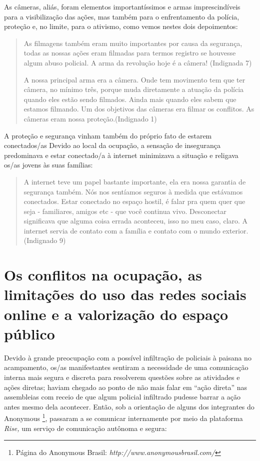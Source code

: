 As câmeras, aliás, foram elementos importantíssimos e armas
imprescindíveis para a visibilização das ações, mas também para o
enfrentamento da polícia, proteção e, no limite, para o ativismo, como
vemos nestes dois depoimentos:

\begin{quote}
As filmagens também eram muito importantes por causa da segurança, todas
as nossas ações eram filmadas para termos registro se houvesse algum
abuso policial. A arma da revolução hoje é a câmera! (Indignada 7)

A nossa principal arma era a câmera. Onde tem movimento tem que ter
câmera, no mínimo três, porque muda diretamente a atuação da polícia
quando eles estão sendo filmados. Ainda mais quando eles sabem que
estamos filmando. Um dos objetivos das câmeras era filmar os conflitos.
As câmeras eram nossa proteção.(Indignado 1)
\end{quote}

A proteção e segurança vinham também do próprio fato de estarem
conectados/as Devido ao local da ocupação, a sensação de insegurança
predominava e estar conectado/a à internet minimizava a situação e
religava os/as jovens às suas famílias:

\begin{quote}
A internet teve um papel bastante importante, ela era nossa garantia de
segurança também. Nós nos sentíamos seguros à medida que estávamos
conectados. Estar conectado no espaço hostil, é falar pra quem quer que
seja - familiares, amigos etc - que você continua vivo. Desconectar
significava que alguma coisa errada aconteceu, isso no meu caso, claro.
A internet servia de contato com a família e contato com o mundo
exterior. (Indignado 9)
\end{quote}

\section{Os conflitos na ocupação, as limitações do uso das redes sociais
online e a valorização do espaço público}

Devido à grande preocupação com a possível infiltração de policiais à
paisana no acampamento, os/as manifestantes sentiram a necessidade de
uma comunicação interna mais segura e discreta para resolverem questões
sobre as atividades e ações diretas; haviam chegado ao ponto de não mais
falar em ``ação direta'' nas assembleias com receio de que algum
policial infiltrado pudesse barrar a ação antes mesmo dela acontecer.
Então, sob a orientação de alguns dos integrantes do Anonymous 
\footnote{Página do Anonymous Brasil:
  \emph{http://www.anonymousbrasil.com/}}, passaram a se comunicar
internamente por meio da plataforma \emph{Rise,} um serviço de
comunicação autônoma e segura:

